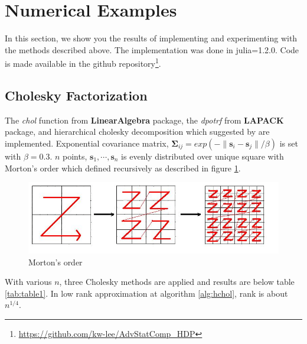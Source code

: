 \section{Numerical Examples}

In this section, we show you the results of implementing and experimenting with the methods described above. The implementation was done in julia=1.2.0. Code is made available in the github repository\footnote{\url{https://github.com/kw-lee/AdvStatComp_HDP}}.

\subsection{Cholesky Factorization}

The \textit{chol} function from \textbf{LinearAlgebra} package, the \textit{dpotrf} from \textbf{LAPACK} package, and hierarchical cholesky decomposition which suggested by \citet{hackbusch2015hierarchical} are implemented. Exponential covariance matrix, $\boldsymbol{\Sigma}_{ij}=exp(-\lVert \mathbf{s}_i-\mathbf{s}_j \rVert/\beta)$ is set with $\beta=0.3$. $n$ points, $\mathbf{s}_1,\cdots,\mathbf{s}_n$ is evenly distributed over unique square with Morton's order which defined recursively as described in figure \ref{fig:morton}.

\begin{figure}[ht]
\centering
	\includegraphics[width=.5\linewidth]{figs/Morton.jpg}
	\caption{Morton's order\citep{salem2016comparative}}
	\label{fig:morton}
\end{figure}

With various $n$, three Cholesky methods are applied and results are below table \ref{tab:table1}. In low rank approximation at algorithm \ref{alg:hchol}, rank is about $n^{1/4}$.

